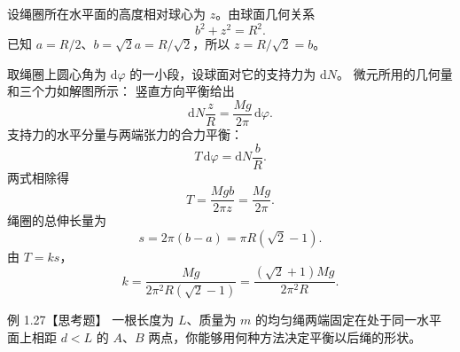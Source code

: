 \begin{xesolution}
设绳圈所在水平面的高度相对球心为 $z$。由球面几何关系
\[
  b^2+z^2=R^2.
\]
已知 $a=R/2$、$b=\sqrt2a=R/\sqrt2$，所以 $z=R/\sqrt2=b$。

取绳圈上圆心角为 $\mathrm d\varphi$ 的一小段，设球面对它的支持力为 $\mathrm dN$。
微元所用的几何量和三个力如解图所示：
\soldiagOneTwentySix
竖直方向平衡给出
\[
  \mathrm dN\frac zR=\frac{Mg}{2\pi}\,\mathrm d\varphi.
\]
支持力的水平分量与两端张力的合力平衡：
\[
  T\,\mathrm d\varphi=\mathrm dN\frac bR.
\]
两式相除得
\[
  T=\frac{Mgb}{2\pi z}=\frac{Mg}{2\pi}.
\]
绳圈的总伸长量为
\[
  s=2\pi(b-a)=\pi R(\sqrt2-1).
\]
由 $T=ks$，
\[
  \boxed{k=\frac{Mg}{2\pi^2R(\sqrt2-1)}
  =\frac{(\sqrt2+1)Mg}{2\pi^2R}}.
\]
\end{xesolution}

\begin{origexamplebox}{例 1.27【思考题】}
一根长度为 $L$、质量为 $m$ 的均匀绳两端固定在处于同一水平面上相距
$d<L$ 的 $A$、$B$ 两点，你能够用何种方法决定平衡以后绳的形状。
\end{origexamplebox}

